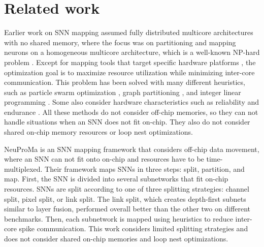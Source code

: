 \section{Related work}
\label{sec:related_work}

Earlier work on SNN mapping assumed fully distributed multicore architectures with no shared memory, where the focus was on partitioning and mapping neurons on a homogeneous multicore architecture, which is a well-known NP-hard problem \cite{huynh2022implementing}. Except for mapping tools that target specific hardware platforms \cite{10.1145/3192366.3192371}, the optimization goal is to maximize resource utilization while minimizing inter-core communication. This problem has been solved with many different heuristics, such as particle swarm optimization \cite{8342201, 10.1145/3386263.3406900}, graph partitioning \cite{titirsha2020thermal, 9996702}, and integer linear programming \cite{das2022realtime}. Some also consider hardware characteristics such as reliability and endurance \cite{titirsha2021endurance}. All these methods do not consider off-chip memories, so they can not handle situations when an SNN does not fit on-chip. They also do not consider shared on-chip memory resources or loop nest optimizations.

NeuProMa \cite{neuproma} is an SNN mapping framework that considers off-chip data movement, where an SNN can not fit onto on-chip and resources have to be time-multiplexed. Their framework maps SNNs in three steps: split, partition, and map. First, the SNN is divided into several subnetworks that fit on-chip resources. SNNs are split according to one of three splitting strategies: channel split, pixel split, or link split. The link split, which creates depth-first subnets similar to layer fusion, performed overall better than the other two on different benchmarks. Then, each subnetwork is mapped using heuristics to reduce inter-core spike communication. This work considers limited splitting strategies and does not consider shared on-chip memories and loop nest optimizations.

